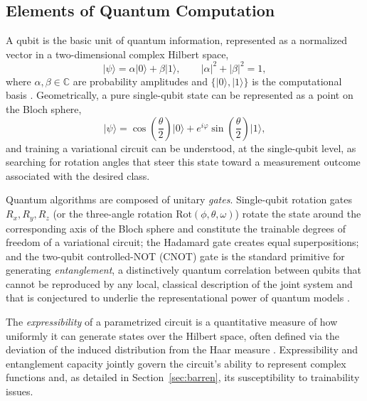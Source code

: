 \documentclass[11pt,a4paper]{article}
\begin{document}
\subsection{Elements of Quantum Computation}

A qubit is the basic unit of quantum information, represented as a normalized
vector in a two-dimensional complex Hilbert space,
\begin{equation}
  \lvert \psi \rangle = \alpha \lvert 0 \rangle + \beta \lvert 1 \rangle,
  \qquad \lvert \alpha \rvert^2 + \lvert \beta \rvert^2 = 1,
  \label{eq:qubit}
\end{equation}
where $\alpha,\beta \in \mathbb{C}$ are probability amplitudes and
$\{\lvert 0\rangle, \lvert 1\rangle\}$ is the computational basis
\cite{nielsen2010}.  Geometrically, a pure single-qubit state can be
represented as a point on the Bloch sphere,
\begin{equation}
  \lvert \psi \rangle = \cos\!\left(\frac{\theta}{2}\right)\lvert 0 \rangle
  + e^{i\varphi}\sin\!\left(\frac{\theta}{2}\right)\lvert 1 \rangle,
  \label{eq:bloch}
\end{equation}
and training a variational circuit can be understood, at the single-qubit
level, as searching for rotation angles that steer this state toward a
measurement outcome associated with the desired class.

Quantum algorithms are composed of unitary \emph{gates}.  Single-qubit
rotation gates $R_x, R_y, R_z$ (or the three-angle rotation
$\mathrm{Rot}(\phi,\theta,\omega)$) rotate the state around the
corresponding axis of the Bloch sphere and constitute the trainable degrees of
freedom of a variational circuit; the Hadamard gate creates equal
superpositions; and the two-qubit controlled-NOT (CNOT) gate is the standard
primitive for generating \emph{entanglement}, a distinctively quantum
correlation between qubits that cannot be reproduced by any local, classical
description of the joint system and that is conjectured to underlie the
representational power of quantum models \cite{nielsen2010}.

The \emph{expressibility} of a parametrized circuit is a quantitative measure
of how uniformly it can generate states over the Hilbert space, often defined
via the deviation of the induced distribution from the Haar measure
\cite{sim2019}.  Expressibility and entanglement capacity jointly govern the
circuit's ability to represent complex functions and, as detailed in
Section~\ref{sec:barren}, its susceptibility to trainability issues.
\end{document}
